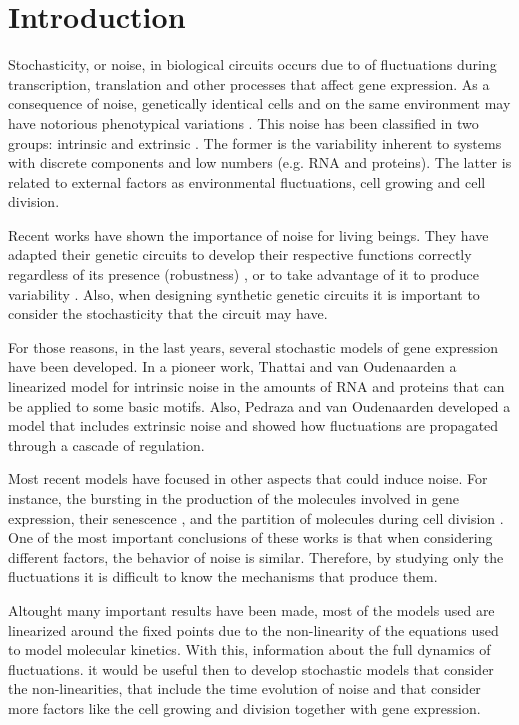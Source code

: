 \chapter*{Introduction}

Stochasticity, or noise, in biological circuits occurs due to of fluctuations during transcription, translation \cite{kaern05} and other processes that affect gene expression. As a consequence of noise, genetically identical cells and on the same environment may have notorious phenotypical variations \cite{kaern05} \cite{elowitz02} \cite{pedraza05}. This noise has been classified in two groups: intrinsic and extrinsic \cite{elowitz02} \cite{paulsson05}. The former is the variability inherent to systems with discrete components and low numbers (e.g. RNA and proteins). The latter is related to external factors as environmental fluctuations, cell growing and cell division.

Recent works have shown the importance of noise for living beings. They have adapted their genetic circuits to develop their respective functions correctly regardless of its presence (robustness) \cite{alon99}, or to take advantage of it to produce variability \cite{arkin98}. Also, when designing synthetic genetic circuits it is important to consider the stochasticity that the circuit may have.

For those reasons, in the last years, several stochastic models of gene expression have been developed. In a pioneer work, Thattai and van Oudenaarden \cite{thattai01} a linearized model for intrinsic noise in the amounts of RNA and proteins that can be applied to some basic motifs. Also, Pedraza and van Oudenaarden \cite{pedraza05} developed a model that includes extrinsic noise and showed how fluctuations are propagated through a cascade of regulation.

Most recent models have focused in other aspects that could induce noise. For instance, the bursting in the production of the molecules involved in gene expression, their senescence \cite{pedraza08}, and the partition of molecules during cell division \cite{huh11a} \cite{huh11b}. One of the most important conclusions of these works is that when considering different factors, the behavior of noise is similar. Therefore, by studying only the fluctuations it is difficult to know the mechanisms that produce them.

Altought many important results have been made, most of the models used are linearized around the fixed points due to the non-linearity of the equations used to model molecular kinetics. With this, information about the full dynamics of fluctuations. it would be useful then to develop stochastic models that consider the non-linearities, that include the time evolution of noise and that consider more factors like the cell growing and division together with gene expression.
